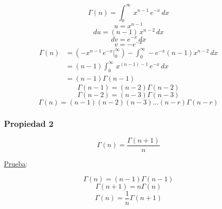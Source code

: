 \begin{equation*}
    \Gamma(n)=\int_0^{\infty}\,x^{n-1}\,e^{-x}\,dx
\end{equation*}
\begin{equation*}
    u=x^{n-1}
\end{equation*}
\begin{equation*}
    du=(n-1)\,x^{n-2}\,dx
\end{equation*}
\begin{equation*}
    dv=e^{-x}\,dx
\end{equation*}
\begin{equation*}
    v=-e^{-x}
\end{equation*}
\begin{equation*}
\begin{split}
    \Gamma(n)
        &=(-x^{n-1}\,e^{-x}\Bigg|_0^{\infty})
        -\int_0^{\infty}-e^{-x}(n-1)x^{n-2}\,dx\\
        &=(n-1)\int_0^{\infty}\,x^{(n-1)-1}\,e^{-x}\,dx\\
        &=(n-1)\Gamma(n-1)
\end{split}
\end{equation*}
\begin{equation*}
    \Gamma(n-1)=(n-2)\Gamma(n-2)
\end{equation*}
\begin{equation*}
    \Gamma(n-2)=(n-3)\Gamma(n-3)
\end{equation*}
\begin{equation*}
    \Gamma(n)=(n-1)(n-2)(n-3)\dots(n-r)\Gamma(n-r)
\end{equation*}

\subsubsection*{Propiedad 2}
\begin{equation}
    \Gamma(n)=\frac{\Gamma(n+1)}{n}
\end{equation}

\underline{Prueba}:

\begin{equation*}
    \Gamma(n)=(n-1)\Gamma(n-1)
\end{equation*}
\begin{equation*}
    \Gamma(n+1)=n\Gamma(n)
\end{equation*}
\begin{equation*}
    \Gamma(n)=\frac{1}{n}\Gamma(n+1)
\end{equation*}

